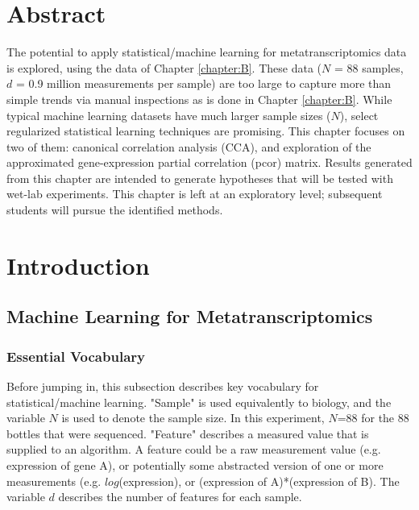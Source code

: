 
\section{Abstract}

The potential to apply statistical/machine learning for metatranscriptomics data is explored, using the data of Chapter \ref{chapter:B}.
These data ($N$  = 88 samples, $d$ = 0.9 million measurements per sample) are too large to capture more than simple trends via manual inspections as is done in Chapter \ref{chapter:B}.
While typical machine learning datasets have much larger sample sizes ($N$), select regularized statistical learning techniques are promising.
This chapter focuses on two of them: canonical correlation analysis (CCA), and exploration of the approximated gene-expression partial correlation (pcor) matrix.
Results generated from this chapter are intended to generate hypotheses that will be tested with wet-lab experiments.
This chapter is left at an exploratory level; subsequent students will pursue the identified methods.


\section{Introduction}

\subsection{Machine Learning for Metatranscriptomics}

\subsubsection{Essential Vocabulary}

Before jumping in, this subsection describes key vocabulary for statistical/machine learning.
"Sample" is used equivalently to biology, and the variable $N$ is used to denote the sample size.
In this experiment, $N$=88 for the 88 bottles that were sequenced.
"Feature" describes a measured value that is supplied to an algorithm.
A feature could be a raw measurement value (e.g. expression of gene A), or potentially some abstracted version of one or more measurements (e.g. $log$(expression), or (expression of A)*(expression of B).
The variable $d$ describes the number of features for each sample.

